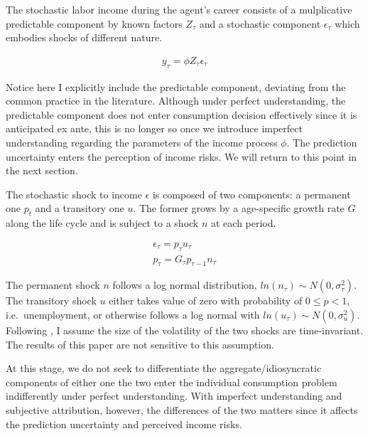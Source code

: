 \documentclass[12pt,notitlepage,onecolumn,aps,pra]{article}
\begin{document}
The stochastic labor income during the agent's career consists of a
mulplicative predictable component by known factors \(Z_\tau\) and a
stochastic component \(\epsilon_{\tau}\) which embodies shocks of
different nature.

\begin{equation}
\begin{split}
y_{\tau} = \phi Z_{\tau}\epsilon_{\tau} 
\end{split}
\end{equation}

Notice here I explicitly include the predictable component, deviating
from the common practice in the literature. Although under perfect
understanding, the predictable component does not enter consumption
decision effectively since it is anticipated ex ante, this is no longer
so once we introduce imperfect understanding regarding the parameters of
the income process \(\phi\). The prediction uncertainty enters the
perception of income risks. We will return to this point in the next
section.

The stochastic shock to income \(\epsilon\) is composed of two
components: a permanent one \(p_t\) and a transitory one \(u\). The
former grows by a age-specific growth rate \(G\) along the life cycle
and is subject to a shock \(n\) at each period.

\begin{equation}
\begin{split}
\epsilon_{\tau} = p_{\tau}u_{\tau} \\
p_{\tau} = G_{\tau}p_{\tau-1} n_{\tau}
\end{split}
\end{equation}

The permanent shock \(n\) follows a log normal distribution,
\(ln(n_\tau) \sim N(0,\sigma^2_\tau)\). The transitory shock \(u\)
either takes value of zero with probability of \(0\leq p<1\),
i.e.~unemployment, or otherwise follows a log normal with
\(ln(u_\tau) \sim N(0,\sigma^2_u)\). Following
\cite{gourinchas2002consumption}, I assume the size of the volatility of
the two shocks are time-invariant. The results of this paper are not
sensitive to this assumption.

At this stage, we do not seek to differentiate the
aggregate/idiosyncratic components of either one the two enter the
individual consumption problem indifferently under perfect
understanding. With imperfect understanding and subjective attribution,
however, the differences of the two matters since it affects the
prediction uncertainty and perceived income risks.
\end{document}
